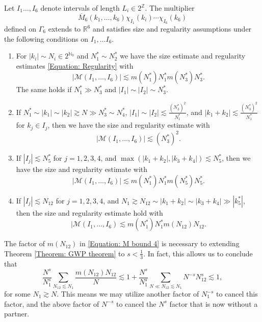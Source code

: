 \documentclass[10pt,a4paper]{amsart}
\newcommand{\cal}[1]{\mathcal{#1}}
\begin{document}
\begin{lemma}\label{Lemma: M6 estimate}
    Let $I_1\dots, I_6$ denote intervals of length $L_i\in 2^\mathbb{Z}$. The multiplier 
    \[
    \overline{M}_6(k_1,\dots, k_6)\chi_{I_1}(k_i)\cdots\chi_{I_6}(k_6)
    \]
    defined on $\Gamma_6$ extends to $\mathbb{R}^6$ and satisfies size and regularity assumptions under the following conditions on $I_1,\dots I_6$.
    \begin{enumerate}[label = (\roman*)]
        \item For $|k_i|\sim N_i\in 2^{\mathbb{N}_0}$ and $N_1^*\sim N_2^*$ we have the size estimate and regularity estimates \eqref{Equation: Regularity} with 
        \begin{equation}\label{equation: M bound 1}
            |\cal{M}(I_1,\dots,I_6)|\lesssim m(N_1^*)N_1^*m(N_3^*)N_3^*.
        \end{equation}
        The same holds if $N_1^*\gg N_3^*$ and $|I_1|\sim |I_2|\sim N_3^*$.
        \item If $N_1^*\sim |k_1|\sim |k_2|\gtrsim N\gg N_3^*\sim N_4^*$, $|I_1|\sim |I_2|\lesssim \tfrac{(N_3^*)^2}{N_1^*}$, and $|k_1+k_2|\lesssim \tfrac{(N_3^*)^2}{N_1^*}$ for $k_j\in I_j$, then we have the size and regularity estimate with
        \begin{equation}\label{Equation: M bound 2}
            |\cal{M}(I_1,\dots, I_6)|\lesssim (N_3^*)^2.
        \end{equation}
        \item If $|I_j|\lesssim N_5^*$ for $j=1,2,3,4$, and $\max(|k_1+k_2|,|k_3+k_4|)\lesssim N_5^*$, then we have the size and regularity estimate with
        \begin{equation}\label{Equation: M bound 3}
            |\cal{M}(I_1,\dots, I_6)|\lesssim m(N_1^*)N_1^*m(N_5^*)N_5^*.
        \end{equation}
        \item If $|I_j|\lesssim N_{12}$ for $j = 1,2,3,4$, and $N_1\gtrsim N_{12}\sim |k_1+k_2|\sim |k_3+k_4|\gg |k_5^*|$, then the size and regularity estimate hold with
        \begin{equation}\label{Equation: M bound 4}
            |\cal{M}(I_1,\dots, I_6)\lesssim m(N_1^*)N_1^*m(N_{12})N_{12}.
        \end{equation}
    \end{enumerate}
\end{lemma}

\begin{remark}\label{Remark: N12 M term}
    The factor of $m(N_{12})$ in \eqref{Equation: M bound 4} is necessary to extending Theorem \ref{Theorem: GWP theorem} to $s < \tfrac{1}{3}$. In fact, this allows us to conclude that
    \[
    \frac{N^s}{N_1^s}\sum_{N_{12}\lesssim N_1}\frac{m(N_{12})N_{12}}{N} \lesssim 1 + \frac{N^s}{N_1^s}\sum_{N\ll N_{12}\lesssim N_1}N^{-s}N_{12}^s\lesssim 1,
    \]
    for some $N_1\gtrsim N$. This means we may utilize another factor of $N_1^{-s}$ to cancel this factor, and the above factor of $N^{-s}$ to cancel the $N^s$ factor that is now without a partner. 
\end{remark}
\end{document}

